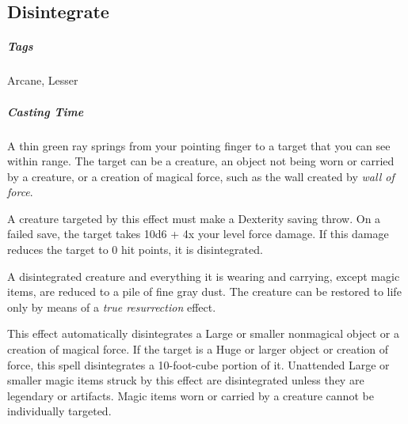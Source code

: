 







\subsection{Disintegrate}
\subparagraph*{Tags} Arcane, Lesser
\subparagraph*{Casting Time}

A thin green ray springs from your pointing finger to a target that you can see within range. The target can be a creature, an object not being worn or carried by a creature, or a creation of magical force, such as the wall created by \textit{wall of force}.

A creature targeted by this effect must make a Dexterity saving throw. On a failed save, the target takes 10d6 + 4x your level force damage. If this damage reduces the target to 0 hit points, it is disintegrated.

A disintegrated creature and everything it is wearing and carrying, except magic items, are reduced to a pile of fine gray dust. The creature can be restored to life only by means of a \textit{true resurrection} effect.

This effect automatically disintegrates a Large or smaller nonmagical object or a creation of magical force. If the target is a Huge or larger object or creation of force, this spell disintegrates a 10-foot-cube portion of it. Unattended Large or smaller magic items struck by this effect are disintegrated unless they are legendary or artifacts. Magic items worn or carried by a creature cannot be individually targeted.

